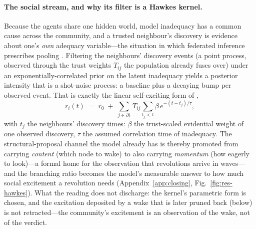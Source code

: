 \paragraph{The social stream, and why its filter is a Hawkes kernel.}
Because the agents share one hidden world, model inadequacy has a common cause across the
community, and a trusted neighbour's discovery is evidence about one's \emph{own} adequacy
variable---the situation in which federated inference prescribes pooling
\citep{friston2023federated}. Filtering the neighbours' discovery events (a point process,
observed through the trust weights $T_{ij}$ the population already fuses over) under an
exponentially-correlated prior on the latent inadequacy yields a posterior intensity that is a
shot-noise process: a baseline plus a decaying bump per observed event. That is exactly the
linear self-exciting form of \citet{hawkes1971},
\begin{equation}
r_i(t) \;=\; r_0 \;+\; \sum_{j\in\partial i}\, T_{ij} \sum_{t_j < t} \beta\, e^{-(t-t_j)/\tau},
\end{equation}
with $t_j$ the neighbours' discovery times: $\beta$ the trust-scaled evidential weight of one
observed discovery, $\tau$ the assumed correlation time of inadequacy. The structural-proposal
channel the model already has is thereby promoted from carrying \emph{content} (which node to
wake) to also carrying \emph{momentum} (how eagerly to look)---a formal home for the observation
that revolutions arrive in waves---and the branching ratio becomes the model's measurable answer
to how much social excitement a revolution needs (Appendix~\ref{app:closing},
Fig.~\ref{fig:res-hawkes}). What the reading does not discharge: the kernel's parametric form is
chosen, and the excitation deposited by a wake that is later pruned back (below) is not
retracted---the community's excitement is an observation of the wake, not of the verdict.


